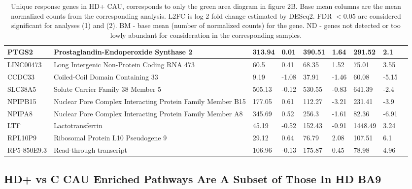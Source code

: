 \documentclass[fleqn,10pt,table]{wlscirep}
\begin{document}
\begin{table}[ht]
\begin{tabular}{|l|l|l|l|l|l|l|l|l|}
PTGS2 & Prostaglandin-Endoperoxide Synthase 2 & 313.94 & 0.01 & 390.51 & 1.64 & 291.52 & 2.1 \\ \hline
LINC00473 & Long Intergenic Non-Protein Coding RNA 473 & 60.5 & 0.41 & 68.35 & 1.52 & 75.01 & 3.55 \\ \hline
CCDC33 & Coiled-Coil Domain Containing 33 & 9.19 & -1.08 & 37.91 & -1.46 & 60.08 & -5.15 \\ \hline
SLC38A5 & Solute Carrier Family 38 Member 5 & 505.13 & -0.12 & 530.55 & -0.83 & 641.39 & -2.4 \\ \hline
NPIPB15 & Nuclear Pore Complex Interacting Protein Family Member B15 & 177.05 & 0.61 & 112.27 & -3.21 & 231.41 & -3.9 \\ \hline
NPIPA8 & Nuclear Pore Complex Interacting Protein Family Member A8 & 345.69 & 0.52 & 256.3 & -1.61 & 82.36 & -6.91 \\ \hline
LTF & Lactotransferrin & 45.19 & -0.52 & 152.43 & -0.91 & 1448.49 & 3.24 \\ \hline
RPL10P9 & Ribosomal Protein L10 Pseudogene 9 & 29.12 & 0.64 & 76.79 & 2.08 & 107.51 & 6.1 \\ \hline
RP5-850E9.3 & Read-through transcript & 106.96 & -0.13 & 175.87 & 0.45 & 78.98 & 4.96 \\ \hline
\end{tabular}
\caption{Unique response genes in HD+ CAU, corresponds to only the green area diagram in figure 2B. Base mean columns are the mean normalized counts from the corresponding analysis. L2FC is log 2 fold change estimated by DESeq2. FDR $< 0.05$ are considered significant for analyses (1) and (2). BM - base mean (number of normalized counts) for the gene. ND - genes not detected or too lowly abundant for consideration in the corresponding samples.\label{tab:CAU_genes}}
\end{table}

\subsection{HD+ vs C CAU Enriched Pathways Are A Subset of Those In HD BA9}
\end{document}
